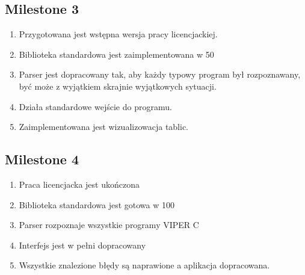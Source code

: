 \documentclass[a4paper,twoside,openright,11pt]{report}
\begin{document}
  \subsection {Milestone 3}
  \begin {enumerate}
    \item Przygotowana jest wstępna wersja pracy licencjackiej.
    \item Biblioteka standardowa jest zaimplementowana w 50%
    \item Parser jest dopracowany tak, aby każdy typowy program był rozpoznawany, być może z wyjątkiem skrajnie wyjątkowych sytuacji.
    \item Działa standardowe wejście do programu.
    \item Zaimplementowana jest wizualizowacja tablic.
  \end {enumerate}
  \subsection {Milestone 4}
  \begin {enumerate}
    \item Praca licencjacka jest ukończona
    \item Biblioteka standardowa jest gotowa w 100%
    \item Parser rozpoznaje wszystkie programy VIPER C
    \item Interfejs jest w pełni dopracowany
    \item Wszystkie znalezione błędy są naprawione a aplikacja dopracowana.
  \end {enumerate}
\end{document}
